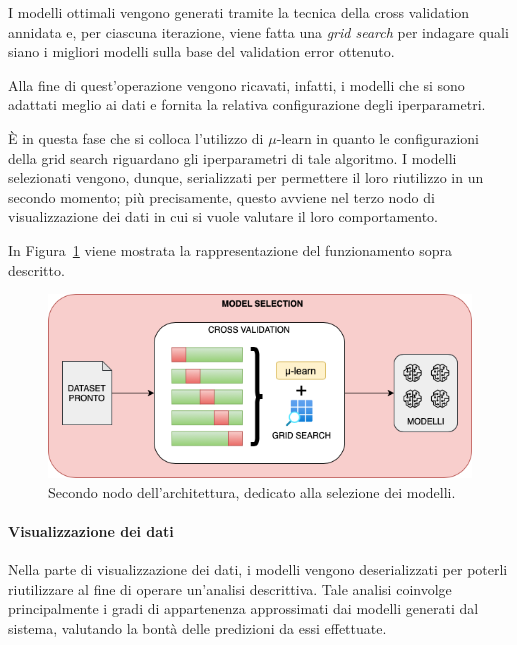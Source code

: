 \documentclass[12pt]{report}
\theoremstyle{definition}
\begin{document}
I modelli ottimali vengono generati tramite la tecnica della cross validation annidata e, per ciascuna iterazione, viene fatta una \textit{grid search} per indagare quali siano i migliori modelli sulla base del validation error ottenuto.

Alla fine di quest'operazione vengono ricavati, infatti, i modelli che si sono adattati meglio ai dati e fornita la relativa configurazione degli iperparametri.

\`E in questa fase che si colloca l'utilizzo di $\mu$-learn in quanto le configurazioni della grid search riguardano gli iperparametri di tale algoritmo.
I modelli selezionati vengono, dunque, serializzati per permettere il loro riutilizzo in un secondo momento; più precisamente, questo avviene nel terzo nodo di visualizzazione dei dati in cui si vuole valutare il loro comportamento.

In Figura~\ref{selectionmodel} viene mostrata la rappresentazione del funzionamento sopra descritto.
\begin{figure}
    \centering
    \includegraphics[scale=0.6]{images/modelselectionmodule.png}
    \caption{Secondo nodo dell'architettura, dedicato alla selezione dei modelli.}
    \label{selectionmodel}
\end{figure}

\paragraph{Visualizzazione dei dati} 
Nella parte di visualizzazione dei dati, i modelli vengono deserializzati per poterli riutilizzare al fine di operare un'analisi descrittiva.
Tale analisi coinvolge principalmente i gradi di appartenenza approssimati dai modelli generati dal sistema, valutando la bontà delle predizioni da essi effettuate.
\end{document}
